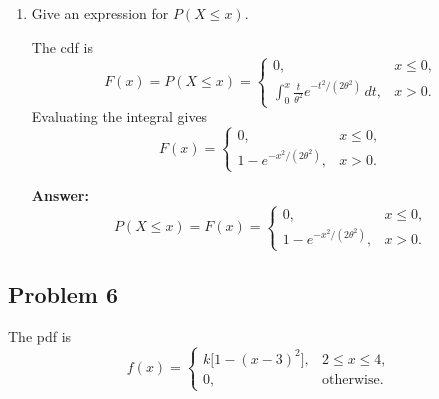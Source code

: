 \documentclass[11pt]{article}
\begin{document}
\begin{enumerate}
    \[
    P(100\le X\le 200)=P(X\le 200)-P(X\le 100).
    \]
    Using
    \[
    F(x)=1-e^{-x^2/(2\theta^2)},
    \]
    with \(\theta=100\),
    \[
    P(100\le X\le 200)
    =(1-e^{-2})-(1-e^{-1/2})
    =e^{-1/2}-e^{-2}.
    \]
    Numerically,
    \[
    P(100\le X\le 200)\approx 0.6065-0.1353=0.4712.
    \]

    \textbf{Answer:}
    \[
    \boxed{e^{-1/2}-e^{-2}\approx 0.4712}
    \]

    \item[(d)] Give an expression for \(P(X\le x)\).

    The cdf is
    \[
    F(x)=P(X\le x)=
    \begin{cases}
    0, & x\le 0,\\[6pt]
    \displaystyle \int_0^x \frac{t}{\theta^2}e^{-t^2/(2\theta^2)}\,dt, & x>0.
    \end{cases}
    \]
    Evaluating the integral gives
    \[
    F(x)=
    \begin{cases}
    0, & x\le 0,\\[6pt]
    1-e^{-x^2/(2\theta^2)}, & x>0.
    \end{cases}
    \]

    \textbf{Answer:}
    \[
    \boxed{
    P(X\le x)=F(x)=
    \begin{cases}
    0, & x\le 0,\\[6pt]
    1-e^{-x^2/(2\theta^2)}, & x>0.
    \end{cases}}
    \]
\end{enumerate}

\subsection*{Problem 6}

The pdf is
\[
f(x)=
\begin{cases}
k\bigl[1-(x-3)^2\bigr], & 2\le x\le 4,\\[4pt]
0, & \text{otherwise.}
\end{cases}
\]
\end{document}
